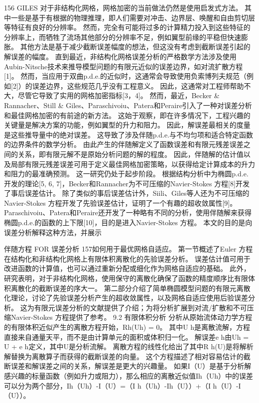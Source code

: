\documentclass[UTF8,11pt,a4paper,openany,fontset=fandol]{ctexbook}
\begin{document}
156 GILES 对于非结构化网格，网格加密的当前做法仍然是使用启发式方法。 其中一些是基于有根据的物理推理，即人们需要对冲击、边界层、唤醒和自由剪切层等特征有良好的分辨率。 然而，完全有可能将过多的计算精力投入到这些特征的分辨率上，而牺牲了流场其他部分的分辨率不足，例如翼型前缘的平稳但快速膨胀。 其他方法是基于减少截断误差幅度的想法，但这没有考虑到截断误差引起的解误差的幅度。 直到最近，非结构化网格误差分析的严格数学方法涉及使用Aubin-Nitsche技术来推导模型问题的有限元近似的误差边界，如对流扩散方程[1]。 然而，当应用于双曲p.d.e.的近似时，这通常会导致使用负索博列夫规范（例如[2]）的误差边界，这些规范几乎没有工程意义。 因此，这通常对工程师帮助不大，尽管它导致了实用的网格加密指标[3，4]。 然而，最近，Becker \& Rannacher、Still \& Giles、Paraschivoiu、Patera和Peraire引入了一种对误差分析和最佳网格加密的有前途的新方法。 这始于观察，即在许多情况下，工程兴趣的关键量是解决方案的功能，例如翼型的升力和阻力。 因此，解误差最相关的度量是这些推导量中的绝对误差。 这导致了涉及伴随p.d.e.与不均匀项和适合特定函数的边界条件的数学分析。 由此产生的伴随解定义了函数误差和有限元残差误差之间的关系，即有限元解不是原始分析问题的解的程度。 因此，伴随解的估计值以及局部有限元残差误差可用于定义最佳网格加密策略，以获得给定计算成本的升力和阻力的最准确预测。 这一研究仍处于起步阶段。 根据结构分析中为椭圆p.d.e.开发的理论[5, 6, 7]，Becker和Rannacher为不可压缩的Navier-Stokes 方程[8]开发了事后误差估计。 除了类似的事后误差估计外，Siili、Giles等人还为不可压缩的Navier-Stokes 方程开发了先验误差估计，证明了一个有趣的超收敛属性[9]。 Paraschivoiu、Patera和Peraire还开发了一种略有不同的分析，使用伴随解来获得椭圆p.d.e.的函数的上下限[10]，目的是进入Navier-Stokes 方程。 本文的目的是向误差分析解释这种方法，并展示

伴随方程 FOR 误差分析 157如何用于最优网格自适应。 第一节概述了Euler 方程在结构化和非结构化网格上有限体积离散化的先验误差分析。 误差估计值可用于改进函数的计算值，也可以通过重新分配或细化作为网格自适应的基础。 此外，研究表明，对于非结构化网格，使用保守的离散化确保了函数的精度顺序比有限体积离散化的截断误差的序大一。 第二部分介绍了简单椭圆模型问题的有限元离散化理论，讨论了先验误差分析产生的超收敛属性，以及网格自适应使用后验误差分析。 这为有限元误差分析的文献提供了介绍；为将分析扩展到对流/扩散和不可压缩Navier-Stokes 方程提供了参考。 9.2 有限体积分析 分析从原始流体动力学方程的有限体积近似产生的离散方程开始，Rh(Uh) = 0。 其中U h是离散流解，方程直接来自通量天平，而不是由计算单元的面积或体积归一化。 解误差e h由Uh = U + e h定义，其中U是分析流解。 离散方程的线性化给出了其中R h(U)是将解析解替换为离散算子而获得的截断误差的向量。 这个方程描述了相对容易估计的截断误差和解误差之间的关系，解误差是更大的兴趣量。 如果I（U）是基于分析解感兴趣的标量函数（例如升力或阻力），那么相应的离散近似值Ih（Uh）中的误差可以分为两个部分，Ih（Uh）-I（U）=（I h（Uh）-Ih（U））+（I h（U）-I（U））。
\end{document}
